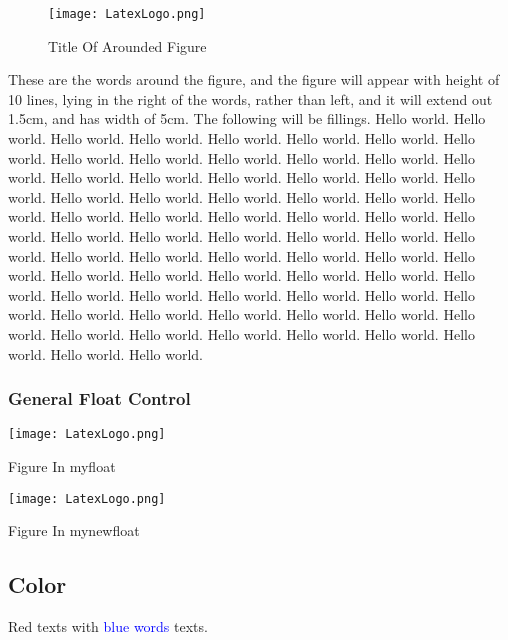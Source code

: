 \begin{wrapfigure}[10]{r}[1.5cm]{5cm}
    \centering
    \texttt{[image: LatexLogo.png]}
    \caption{Title Of Arounded Figure}
\end{wrapfigure}
These are the words around the figure, and the figure will appear with height of 10 lines, 
lying in the right of the words, rather than left, and it will extend out 1.5cm, and has width of 5cm. 
The following will be fillings. 
Hello world. Hello world. Hello world. Hello world. Hello world. Hello world. Hello world. 
Hello world. Hello world. Hello world. Hello world. Hello world. Hello world. Hello world. 
Hello world. Hello world. Hello world. Hello world. Hello world. Hello world. Hello world. 
Hello world. Hello world. Hello world. Hello world. Hello world. Hello world. Hello world. 
Hello world. Hello world. Hello world. Hello world. Hello world. Hello world. Hello world. 
Hello world. Hello world. Hello world. Hello world. Hello world. Hello world. Hello world. 
Hello world. Hello world. Hello world. Hello world. Hello world. Hello world. Hello world. 
Hello world. Hello world. Hello world. Hello world. Hello world. Hello world. Hello world. 
Hello world. Hello world. Hello world. Hello world. Hello world. Hello world. Hello world. 
Hello world. Hello world. Hello world. Hello world. Hello world. Hello world. Hello world.

\subsubsection{General Float Control}
\begin{myfloat}                 %
    \centering
    \texttt{[image: LatexLogo.png]}
    \caption{Figure In myfloat}
\end{myfloat}

\begin{mynewfloat}              %
    \centering
    \texttt{[image: LatexLogo.png]}
    \caption{Figure In mynewfloat}
\end{mynewfloat}

\FloatBarrier                   %


\subsection{Color}
{
    \color{red}
    Red texts with \textcolor{blue}{blue words} texts.
}

